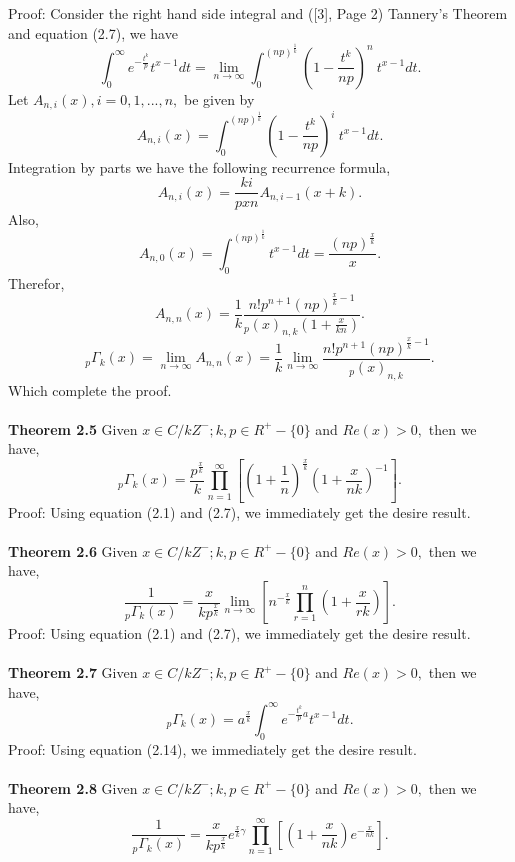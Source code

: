 \documentclass[11pt,a4paper]{article}
\numberwithin{equation}{section}
\begin{document}
Proof: Consider the right hand side integral and ([3],  Page 2) Tannery's Theorem and equation (2.7), we have\\
\[\int^{\infty}_{0}e^{-\frac{t^{k}}{p}}t^{x-1}dt=\lim _{n \rightarrow \infty}\int^{(np)^{\frac{1}{k}}}_{0}(1-\frac{t^{k}}{np})^{n}\:t^{x-1}dt.\]
Let $ A_{n,i}(x), i = 0,1,...,n, $ be given by
\[A_{n,i}(x) = \int^{(np)^{\frac{1}{k}}}_{0}(1-\frac{t^{k}}{np})^{i}\:t^{x-1}dt.\] 
Integration by parts we have the following recurrence formula,
\[A_{n,i}(x)= \frac{ki}{pxn} A_{n,i-1}(x+k).\]
Also,
\[A_{n,0}(x)= \int^{(np)^{\frac{1}{k}}}_{0}t^{x-1}dt=\frac{(np)^{\frac{x}{k}}}{x}.\]
Therefor,
\[A_{n,n}(x)= \frac{1}{k} \dfrac{n!p^{n+1}(np)^{\frac{x}{k}-1}}{_{p}(x)_{n,k}(1+\frac{x}{kn})}.\]
\[ _{p}\Gamma_{k}(x)= \lim_{n\rightarrow \infty} A_{n,n}(x) =\frac{1}{k}\lim_{n\rightarrow \infty} \dfrac{n!p^{n+1}(np)^{\frac{x}{k}-1}}{_{p}(x)_{n,k}}.\]
Which complete the proof.\\\\ 
\textbf{Theorem 2.5} Given $ x\in C / kZ^{-}; k,p\in R^{+}-\lbrace 0 \rbrace $ and $ Re(x)>0, $
then we have,
\begin{equation}
_{p}\Gamma_{k}(x)=\frac{p^{\frac{x}{k}}}{k}\prod_{n=1}^{\infty}[(1+\frac{1}{n})^{\frac{x}{k}}(1+\frac{x}{nk})^{-1}].
\end{equation}
Proof: Using equation (2.1) and (2.7), we immediately get the desire result.\\\\
\textbf{Theorem 2.6} Given $ x\in C / kZ^{-}; k,p\in R^{+}-\lbrace 0 \rbrace $ and $ Re(x)>0, $
then we have,
\begin{equation}
\frac{1}{_{p}\Gamma_{k}(x)}=\frac{x}{kp^{\frac{x}{k}}}\lim _{n\rightarrow\infty}[n^{-\frac{x}{k}}\prod_{r=1}^{n}(1+\frac{x}{rk})].
\end{equation}
Proof: Using equation (2.1) and (2.7), we immediately get the desire result.\\\\
\textbf{Theorem 2.7} Given $ x\in C / kZ^{-}; k,p\in R^{+}-\lbrace 0 \rbrace $ and $ Re(x)>0, $
then we have,
\begin{equation}
_{p}\Gamma_{k}(x)=a^{\frac{x}{k}}\int^{\infty}_{0}e^{-\frac{t^{k}}{p}a}t^{x-1}dt.
\end{equation}
Proof: Using equation (2.14), we immediately get the desire result.\\\\
\textbf{Theorem 2.8} Given $ x\in C / kZ^{-}; k,p\in R^{+}-\lbrace 0 \rbrace $ and $ Re(x)>0, $
then we have,
\begin{equation}
\frac{1}{_{p}\Gamma_{k}(x)}=\frac{x}{kp^{\frac{x}{k}}}e^{\frac{x}{k}\gamma}\prod_{n=1}^{\infty}[(1+\frac{x}{nk})e^{-\frac{x}{nk}}].
\end{equation}
\end{document}
